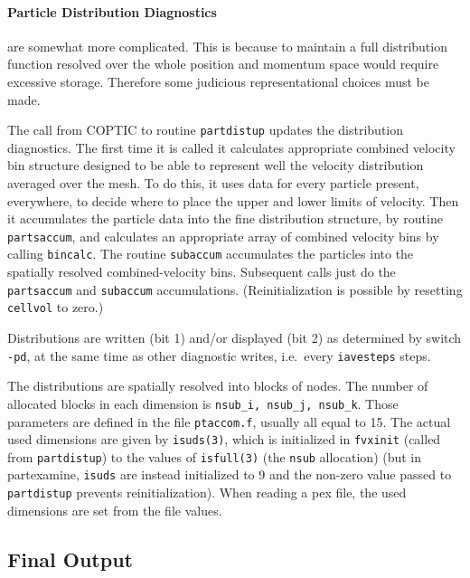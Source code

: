 \documentclass[12pt]{article}
\begin{document}
\paragraph{Particle Distribution Diagnostics} are somewhat more
complicated. This is because to maintain a full distribution function
resolved over the whole position and momentum space would require
excessive storage. Therefore some judicious representational choices
must be made. 

The call from COPTIC to routine \verb!partdistup! updates
the distribution diagnostics. The first time it is called it
calculates appropriate combined velocity bin structure designed to be able to
represent well the velocity distribution averaged over the mesh. To do
this, it uses data for every particle present, everywhere, to decide
where to place the upper and lower limits of velocity. Then it
accumulates the particle data into the fine distribution structure, by
routine \verb!partsaccum!, and calculates an appropriate array of
combined velocity bins by calling \verb!bincalc!. The routine
\verb!subaccum! accumulates the particles into the spatially resolved
combined-velocity bins. Subsequent calls just do the \verb!partsaccum!
and \verb!subaccum! accumulations. (Reinitialization is possible by
resetting \verb!cellvol! to zero.)

Distributions are written (bit 1) and/or displayed (bit 2) as
determined by switch \verb!-pd!, at the same time as other diagnostic
writes, i.e.\ every \verb!iavesteps! steps. 

The distributions are spatially resolved into blocks of nodes. The
number of allocated blocks in each dimension is
\verb!nsub_i, nsub_j, nsub_k!.  Those parameters are defined in the
file \verb!ptaccom.f!, usually all equal to 15. The actual used
dimensions are given by \verb!isuds(3)!, which is initialized in
\verb!fvxinit! (called from \verb!partdistup!) to the values of
\verb!isfull(3)! (the \verb!nsub! allocation) (but in partexamine,
\verb!isuds! are instead initialized to 9 and the non-zero value
passed to \verb!partdistup! prevents reinitialization). When reading a
pex file, the used dimensions are set from the file values.



\subsection{Final Output}
\end{document}

